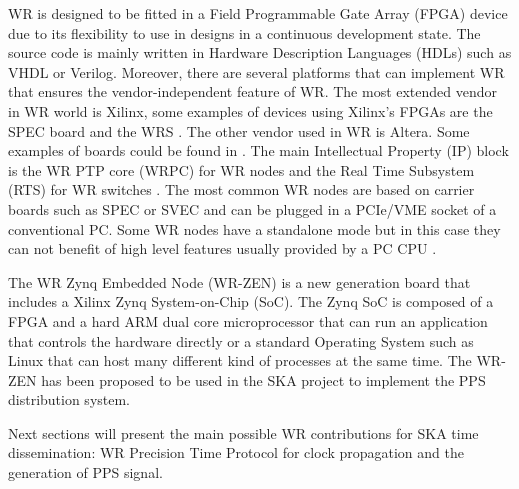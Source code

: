 
WR is designed to be fitted in a Field Programmable Gate Array (FPGA) device due to its flexibility to use in designs in a continuous development state. The source code is mainly written in Hardware Description Languages (HDLs) such as VHDL or Verilog. Moreover, there are several platforms that can implement WR that ensures the vendor-independent feature of WR. The most extended vendor in WR world is Xilinx, some examples of devices using Xilinx's FPGAs are the SPEC board \cite{ohwr:spec} and the WRS \cite{ohwr:wrs}. The other vendor used in WR is Altera. Some examples of boards could be found in \cite{cesar-altera-wr}. The main Intellectual Property (IP) block is the WR PTP core (WRPC) for WR nodes and the Real Time Subsystem (RTS) for WR switches . The most common WR nodes are based on carrier boards such as SPEC or SVEC and can be plugged in a PCIe/VME socket of a conventional PC. Some WR nodes have a standalone mode but in this case they can not benefit of high level features usually provided by a PC CPU				.

The WR Zynq Embedded Node (WR-ZEN) is a new generation board that includes a Xilinx Zynq System-on-Chip (SoC). The Zynq SoC is composed of a FPGA and a hard ARM dual core microprocessor that can run an application that controls the hardware directly or a standard Operating System such as Linux that can host many different kind of processes at the same time. The WR-ZEN has been proposed to be used in the SKA project to implement the PPS distribution system.

Next sections will present the main possible WR contributions for SKA time dissemination: WR Precision Time Protocol for clock propagation and the generation of PPS signal. 
